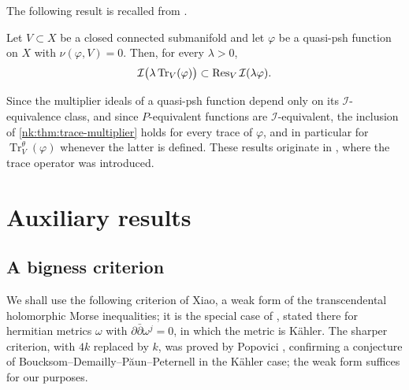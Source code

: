 The following result is recalled from \cite[Proposition~8.2.3]{SGPT}.

\begin{theorem}\label{nk:thm:trace-multiplier}
Let $V\subset X$ be a closed connected submanifold and let $\varphi$ be a
quasi-psh function on $X$ with $\nu(\varphi,V)=0$. Then, for every
$\lambda>0$,
\[
  \mathcal I\bigl(\lambda\operatorname{Tr}_V(\varphi)\bigr)\subset\operatorname{Res}_{V}\mathcal I(\lambda\varphi).
\]
\end{theorem}

Since the multiplier ideals of a quasi-psh function depend only on its
$\mathcal I$-equivalence class, and since $P$-equivalent functions are
$\mathcal I$-equivalent, the inclusion of \cref{nk:thm:trace-multiplier} holds for
every trace of $\varphi$, and in particular for
$\operatorname{Tr}^\theta_V(\varphi)$ whenever the latter is defined. These results
originate in \cite{DX24}, where the trace operator was introduced.

\section{Auxiliary results}\label{nk:sec:aux}

\subsection{A bigness criterion}

We shall use the following criterion of Xiao, a weak form of the
transcendental holomorphic Morse inequalities; it is the special case of
\cite[Theorem~1.4]{Xiao15}, stated there for hermitian metrics $\omega$
with $\partial\bar\partial\omega^j=0$, in which the metric is K\"ahler.
The sharper criterion, with $4k$ replaced by $k$, was proved by
Popovici \cite[Theorem~1.1]{Pop16}, confirming a conjecture of
Boucksom--Demailly--P\u{a}un--Peternell in the K\"ahler case; the weak
form suffices for our purposes.


